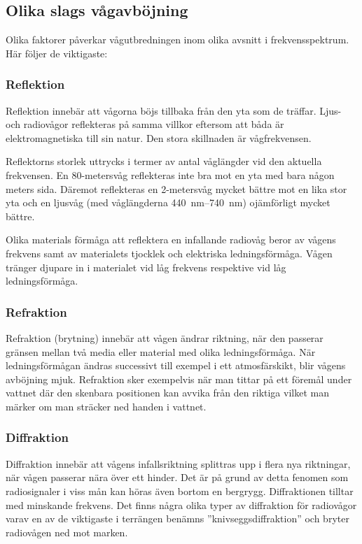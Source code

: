 \subsection{Olika slags vågavböjning}

Olika faktorer påverkar vågutbredningen inom olika avsnitt i
frekvensspektrum. Här följer de viktigaste:

\subsubsection{Reflektion}
\label{vågutbredning_reflektion}

Reflektion innebär att vågorna böjs tillbaka från den yta som de träffar.
Ljus- och radiovågor reflekteras på samma villkor eftersom att båda är
elektromagnetiska till sin natur.
Den stora skillnaden är vågfrekvensen.

Reflektorns storlek uttrycks i termer av antal våglängder vid den
aktuella frekvensen.
En 80-metersvåg reflekteras inte bra mot en yta med bara någon meters sida.
Däremot reflekteras en 2-metersvåg mycket bättre mot en lika stor yta och en
ljusvåg (med våglängderna \SIrange{440}{740}{\nano\metre}) ojämförligt mycket bättre.

Olika materials förmåga att reflektera en infallande radiovåg beror av
vågens frekvens samt av materialets tjocklek och elektriska ledningsförmåga.
Vågen tränger djupare in i materialet vid låg frekvens respektive vid låg
ledningsförmåga.

\subsubsection{Refraktion}

Refraktion (brytning) innebär att vågen ändrar riktning, när den passerar
gränsen mellan två media eller material med olika ledningsförmåga.
När ledningsförmågan ändras successivt till exempel i ett atmosfärskikt, blir
vågens avböjning mjuk.
Refraktion sker exempelvis när man tittar på ett föremål under vattnet där den
skenbara positionen kan avvika från den riktiga vilket man märker om man
sträcker ned handen i vattnet.

\subsubsection{Diffraktion}

Diffraktion innebär att vågens infallsriktning splittras upp i flera nya
riktningar, när vågen passerar nära över ett hinder.
Det är på grund av detta fenomen som radiosignaler i viss mån kan höras även
bortom en bergrygg.
Diffraktionen tilltar med minskande frekvens.
Det finns några olika typer av diffraktion för radiovågor varav en av de
viktigaste i terrängen benämns ''knivseggsdiffraktion'' och bryter radiovågen
ned mot marken.
